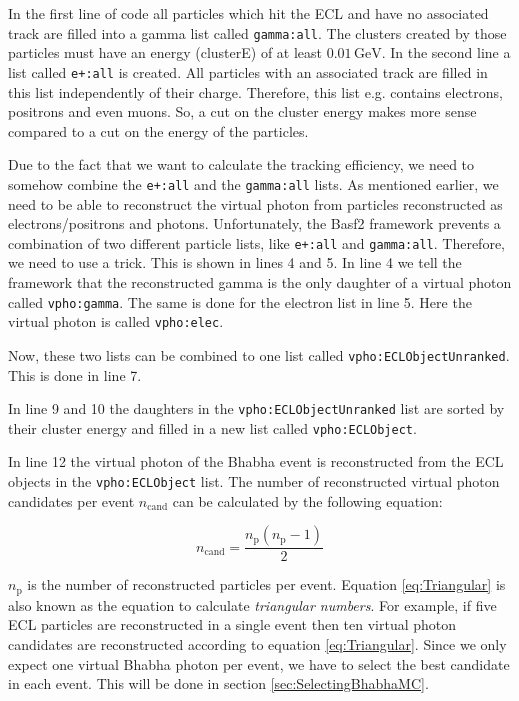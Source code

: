 \documentclass[a4paper,11pt,twosided,final,german,openbib,pdftex,listof=totoc,bibliography=totoc]{scrbook}
\begin{document}
In the first line of code all particles which hit the ECL and have no associated track are filled into a gamma list called \texttt{gamma:all}. The clusters created by those particles must have an energy (clusterE) of at least $0.01\,\textrm{GeV}$. In the second line a list called \texttt{e+:all} is created. All particles with an associated track are filled in this list independently of their charge. Therefore, this list e.g. contains electrons, positrons and even muons. So, a cut on the cluster energy makes more sense compared to a cut on the energy of the particles.


Due to the fact that we want to calculate the tracking efficiency, we need to somehow combine the \texttt{e+:all} and the \texttt{gamma:all} lists. As mentioned earlier, we need to be able to reconstruct the virtual photon from particles reconstructed as electrons/positrons and photons.
Unfortunately, the Basf2 framework prevents a combination of two different particle lists, like \texttt{e+:all} and \texttt{gamma:all}. Therefore, we need to use a trick. This is shown in lines 4 and 5. In line 4 we tell the framework that the reconstructed gamma is the only daughter of a virtual photon called \texttt{vpho:gamma}. The same is done for the electron list in line 5. Here the virtual photon is called \texttt{vpho:elec}. 

Now, these two lists can be combined to one list called \texttt{vpho:ECLObjectUnranked}. This is done in line 7.

In line 9 and 10 the daughters in the \texttt{vpho:ECLObjectUnranked} list are sorted by their cluster energy and filled in a new list called \texttt{vpho:ECLObject}.

In line 12 the virtual photon of the Bhabha event is reconstructed from the ECL objects in the \texttt{vpho:ECLObject} list. The number of reconstructed virtual photon candidates per event $n_{\textrm{cand}}$ can be calculated by the following equation\cite{triangular}:

\begin{equation}
n_{\textrm{cand}} = \frac{n_{\textrm{p}}(n_{\textrm{p}} -1)}{2}
\label{eq:Triangular}
\end{equation}

$n_{\textrm{p}}$ is the number of reconstructed particles per event. Equation \ref{eq:Triangular} is also known as the equation to calculate \textit{triangular numbers}. For example, if five ECL particles are reconstructed in a single event then ten virtual photon candidates are reconstructed according to equation \ref{eq:Triangular}. Since we only expect one virtual Bhabha photon per event, we have to select the best candidate in each event. This will be done in section \ref{sec:SelectingBhabhaMC}.
\end{document}
